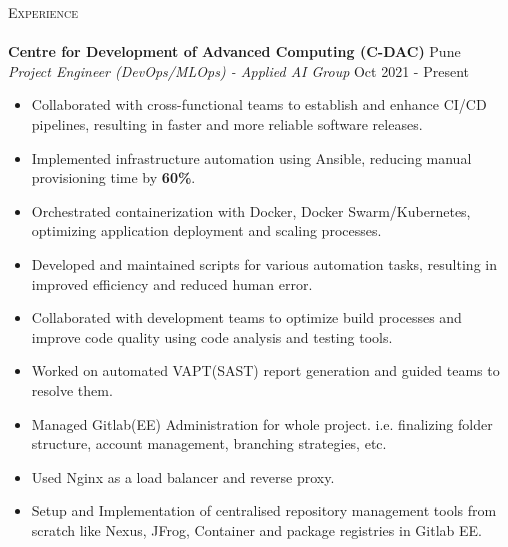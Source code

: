 \documentclass[a4paper]{article}
\newcommand{\lineunder} {
    \vspace*{-8pt} \\
    \hspace*{-18pt} \hrulefill \\
}
\newcommand{\header} [1] {
    {\hspace*{-18pt}\vspace*{6pt} \textsc{#1}}
    \vspace*{-6pt} \lineunder
}
\begin{document}
\header{Experience}
\vspace{1mm}
\textbf{Centre for Development of Advanced Computing (C-DAC)} \hfill Pune\\
\textit{Project Engineer (DevOps/MLOps) - Applied AI Group} \hfill Oct 2021 - Present\\
\vspace{-1mm}
\begin{itemize} \itemsep 1pt
    \item Collaborated with cross-functional teams to establish and enhance CI/CD pipelines, resulting in faster and more reliable software releases.
    \item Implemented infrastructure automation using Ansible, reducing manual provisioning time by \textbf{60\%}.
    \item Orchestrated containerization with Docker, Docker Swarm/Kubernetes, optimizing application deployment and scaling processes.
    \item Developed and maintained scripts for various automation tasks, resulting in improved efficiency and reduced human error.
    \item Collaborated with development teams to optimize build processes and improve code quality using code analysis and testing tools.
    \item Worked on automated VAPT(SAST) report generation and guided teams to resolve them. 
    \item Managed Gitlab(EE) Administration for whole project. i.e. finalizing folder structure, account management, branching strategies, etc.
    \item Used Nginx as a load balancer and reverse proxy.
    \item Setup and Implementation of centralised repository management tools from scratch like Nexus, JFrog, Container and package registries in Gitlab EE.
\end{itemize}
\end{document}
